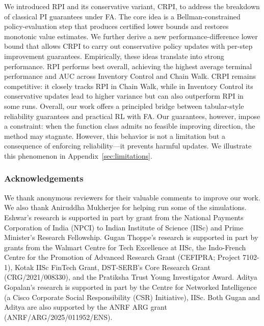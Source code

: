 \documentclass[twoside]{article}
\theoremstyle{plain}
\theoremstyle{definition}
\theoremstyle{remark}
\begin{document}
We introduced RPI and its conservative variant, CRPI, to address the breakdown of classical PI guarantees under FA. The core idea is a Bellman-constrained policy-evaluation step that produces certified lower bounds and restores monotonic value estimates. We further derive a new performance-difference lower bound that allows CRPI to carry out conservative policy updates with per-step improvement guarantees.  
Empirically, these ideas translate into strong performance. RPI performs best overall, achieving the highest average terminal performance and AUC across Inventory Control and Chain Walk. CRPI remains competitive: it closely tracks RPI in Chain Walk, while in Inventory Control its conservative updates lead to higher variance but can also outperform RPI in some runs. Overall, our work offers a principled bridge between tabular-style reliability guarantees and practical RL with FA. Our guarantees, however, impose a constraint: when the function class admits no feasible improving direction, the method may stagnate. However, this behavior is not a limitation but a consequence of enforcing reliability—it prevents harmful updates. We illustrate this phenomenon in Appendix~\ref{sec:limitations}.


\subsubsection*{Acknowledgements}
 
We thank anonymous reviewers for their valuable comments to improve our work. We also thank Aniruddha Mukherjee for helping run some of the simulations. Eshwar's research is supported in part by grant from the National Payments Corporation of India (NPCI) to Indian Institute of Science (IISc) and Prime Minister's Research Fellowship. Gugan Thoppe's research is supported in part by grants from the Walmart Centre for Tech Excellence at IISc, the Indo-French Centre for the Promotion of Advanced Research Grant (CEFIPRA; Project 7102-1), Kotak IISc FinTech Grant, DST-SERB's Core Research Grant (CRG/2021/008330), and the Pratiksha Trust Young Investigator Award. Aditya Gopalan's research is supported in part by the Centre for Networked Intelligence (a Cisco Corporate Social Responsibility (CSR) Initiative), IISc. Both Gugan and Aditya are also supported by the ANRF ARG grant (ANRF/ARG/2025/011952/ENS).



% 

\clearpage
\appendix
\thispagestyle{empty}
\end{document}
